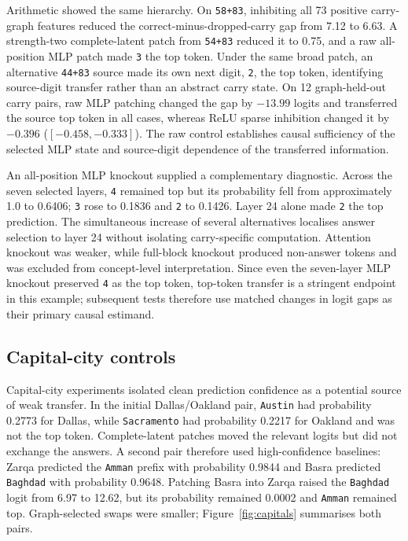 \documentclass[11pt,a4paper]{article}
\newcommand{\code}[1]{\nolinkurl{#1}}
\begin{document}
    Arithmetic showed the same hierarchy. On \code{58+83}, inhibiting all 73 positive carry-graph features reduced the correct-minus-dropped-carry gap from 7.12 to 6.63. A strength-two complete-latent patch from \code{54+83} reduced it to 0.75, and a raw all-position MLP patch made \texttt{3} the top token. Under the same broad patch, an alternative \code{44+83} source made its own next digit, \texttt{2}, the top token, identifying source-digit transfer rather than an abstract carry state. On 12 graph-held-out carry pairs, raw MLP patching changed the gap by $-13.99$ logits and transferred the source top token in all cases, whereas ReLU sparse inhibition changed it by $-0.396$ ($[-0.458,-0.333]$). The raw control establishes causal sufficiency of the selected MLP state and source-digit dependence of the transferred information.

    An all-position MLP knockout supplied a complementary diagnostic. Across the seven selected layers, \texttt{4} remained top but its probability fell from approximately 1.0 to 0.6406; \texttt{3} rose to 0.1836 and \texttt{2} to 0.1426. Layer 24 alone made \texttt{2} the top prediction. The simultaneous increase of several alternatives localises answer selection to layer 24 without isolating carry-specific computation. Attention knockout was weaker, while full-block knockout produced non-answer tokens and was excluded from concept-level interpretation. Since even the seven-layer MLP knockout preserved \texttt{4} as the top token, top-token transfer is a stringent endpoint in this example; subsequent tests therefore use matched changes in logit gaps as their primary causal estimand.

\subsection{Capital-city controls}

    Capital-city experiments isolated clean prediction confidence as a potential source of weak transfer. In the initial Dallas/Oakland pair, \texttt{Austin} had probability 0.2773 for Dallas, while \texttt{Sacramento} had probability 0.2217 for Oakland and was not the top token. Complete-latent patches moved the relevant logits but did not exchange the answers. A second pair therefore used high-confidence baselines: Zarqa predicted the \texttt{Amman} prefix with probability 0.9844 and Basra predicted \texttt{Baghdad} with probability 0.9648. Patching Basra into Zarqa raised the \texttt{Baghdad} logit from 6.97 to 12.62, but its probability remained 0.0002 and \texttt{Amman} remained top. Graph-selected swaps were smaller; Figure~\ref{fig:capitals} summarises both pairs.
\end{document}

